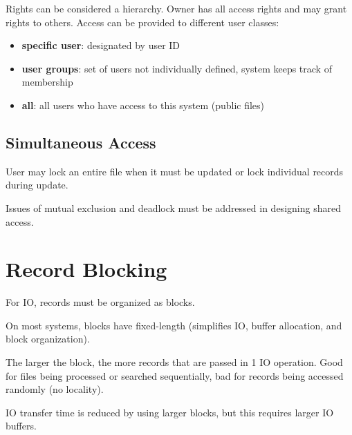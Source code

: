 \documentclass[11pt]{article}
\begin{document}
Rights can be considered a hierarchy.
Owner has all access rights and may grant rights to others.
Access can be provided to different user classes:
\begin{itemize}
\item \textbf{specific user}: designated by user ID
\item \textbf{user groups}: set of users not individually defined, system keeps track of membership
\item \textbf{all}: all users who have access to this system (public files)
\end{itemize}
\subsection{Simultaneous Access}
\label{sec:orgeebf919}
User may lock an entire file when it must be updated or lock individual records during update.

Issues of mutual exclusion and deadlock must be addressed in designing shared access.
\section{Record Blocking}
\label{sec:org3a91b6e}
For IO, records must be organized as blocks.

On most systems, blocks have fixed-length (simplifies IO, buffer allocation, and block organization).

The larger the block, the more records that are passed in 1 IO operation.
Good for files being processed or searched sequentially, bad for records being accessed randomly (no
locality).

IO transfer time is reduced by using larger blocks, but this requires larger IO buffers.
\end{document}
